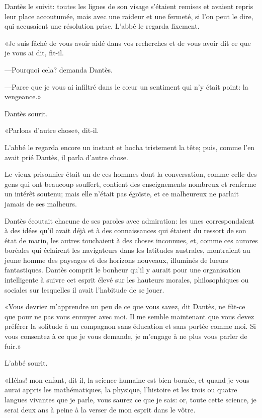 Dantès le suivit: toutes les lignes de son visage s'étaient remises et avaient repris leur place accoutumée, mais avec une raideur et une fermeté, si l'on peut le dire, qui accusaient une résolution prise. L'abbé le regarda fixement.

«Je suis fâché de vous avoir aidé dans vos recherches et de vous avoir dit ce que je vous ai dit, fit-il.

—Pourquoi cela? demanda Dantès.

—Parce que je vous ai infiltré dans le cœur un sentiment qui n'y était point: la vengeance.»

Dantès sourit.

«Parlons d'autre chose», dit-il.

L'abbé le regarda encore un instant et hocha tristement la tête; puis, comme l'en avait prié Dantès, il parla d'autre chose.

Le vieux prisonnier était un de ces hommes dont la conversation, comme celle des gens qui ont beaucoup souffert, contient des enseignements nombreux et renferme un intérêt soutenu; mais elle n'était pas égoïste, et ce malheureux ne parlait jamais de ses malheurs.

Dantès écoutait chacune de ses paroles avec admiration: les unes correspondaient à des idées qu'il avait déjà et à des connaissances qui étaient du ressort de son état de marin, les autres touchaient à des choses inconnues, et, comme ces aurores boréales qui éclairent les navigateurs dans les latitudes australes, montraient au jeune homme des paysages et des horizons nouveaux, illuminés de lueurs fantastiques. Dantès comprit le bonheur qu'il y aurait pour une organisation intelligente à suivre cet esprit élevé sur les hauteurs morales, philosophiques ou sociales sur lesquelles il avait l'habitude de se jouer.

«Vous devriez m'apprendre un peu de ce que vous savez, dit Dantès, ne fût-ce que pour ne pas vous ennuyer avec moi. Il me semble maintenant que vous devez préférer la solitude à un compagnon sans éducation et sans portée comme moi. Si vous consentez à ce que je vous demande, je m'engage à ne plus vous parler de fuir.»

L'abbé sourit.

«Hélas! mon enfant, dit-il, la science humaine est bien bornée, et quand je vous aurai appris les mathématiques, la physique, l'histoire et les trois ou quatre langues vivantes que je parle, vous saurez ce que je sais: or, toute cette science, je serai deux ans à peine à la verser de mon esprit dans le vôtre.

